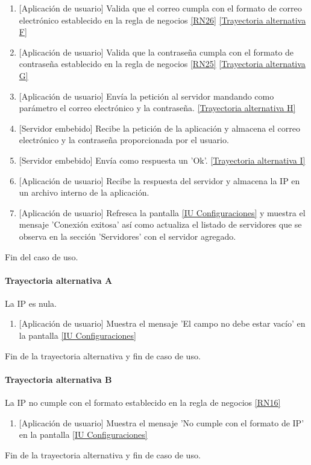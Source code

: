 \begin{enumerate}
		\item {[Aplicación de usuario]} Valida que el correo cumpla con el formato de correo electrónico establecido en la regla de negocios \ref{RN26} \hyperref[SUB-U-CU1.4:TF]{[Trayectoria alternativa F]}
		\item {[Aplicación de usuario]} Valida que la contraseña cumpla con el formato de contraseña establecido en la regla de negocios \ref{RN25} \hyperref[SUB-U-CU1.4:TG]{[Trayectoria alternativa G]}
		\item {[Aplicación de usuario]} Envía la petición al servidor mandando como parámetro el correo electrónico y la contraseña. \hyperref[SUB-U-CU1.4:TH]{[Trayectoria alternativa H]}
		\item {[Servidor embebido]} Recibe la petición de la aplicación y almacena el correo electrónico y la contraseña proporcionada por el usuario.
		\item {[Servidor embebido]} Envía como respuesta un 'Ok'. \hyperref[SUB-U-CU1.4:TI]{[Trayectoria alternativa I]}
		\item {[Aplicación de usuario]} Recibe la respuesta del servidor y almacena la IP en un archivo interno de la aplicación.
		\item {[Aplicación de usuario]} Refresca la pantalla \hyperref[fig:Configuraciones]{[IU Configuraciones]} y muestra el mensaje 'Conexión exitosa' así como actualiza el listado de servidores que se observa en la sección 'Servidores' con el servidor agregado. 
	\end{enumerate}
	Fin del caso de uso.

\paragraph{Trayectoria alternativa A} \label{SUB-U-CU1.4:TA}
	La IP es nula.
	\begin{enumerate}[label=A\arabic*.]
		\item {[Aplicación de usuario]} Muestra el mensaje 'El campo no debe estar vacío' en la pantalla \hyperref[fig:Configuraciones]{[IU Configuraciones]}
	\end{enumerate}
	Fin de la trayectoria alternativa y fin de caso de uso.
	
\paragraph{Trayectoria alternativa B} 
\label{SUB-U-CU1.4:TB}
	La IP no cumple con el formato establecido en la regla de negocios \ref{RN16}
	\begin{enumerate}[label=A\arabic*.]
		\item {[Aplicación de usuario]} Muestra el mensaje 'No cumple con el formato de IP' en la pantalla \hyperref[fig:Configuraciones]{[IU Configuraciones]}
	\end{enumerate}
	Fin de la trayectoria alternativa y fin de caso de uso.
	
